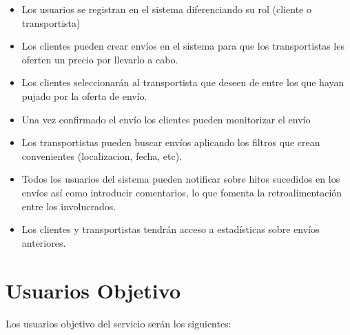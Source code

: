 \documentclass[10pt, a4paper,spanish]{article}
\begin{document}
			\begin{itemize}

				\item Los usuarios se registran en el sistema diferenciando su rol (cliente o transportista)

				\item Los clientes pueden crear envíos en el sistema para que los transportistas les oferten un precio por llevarlo a cabo.

				\item Los clientes seleccionarán al transportista que deseen de entre los que hayan pujado por la oferta de envío.

				\item Una vez confirmado el envío los clientes pueden monitorizar el envío

				\item Los transportistas pueden buscar envíos aplicando los filtros que crean convenientes (localizacion, fecha, etc).

				\item Todos los usuarios del sistema pueden notificar sobre hitos sucedidos en los envíos así como introducir comentarios, lo que fomenta la retroalimentación entre los involucrados.

				\item Los clientes y transportistas tendrán acceso a estadísticas sobre envíos anteriores.


			\end{itemize}



		\section{Usuarios Objetivo}

			\paragraph{}
			Los usuarios objetivo del servicio serán los siguientes:
\end{document}
